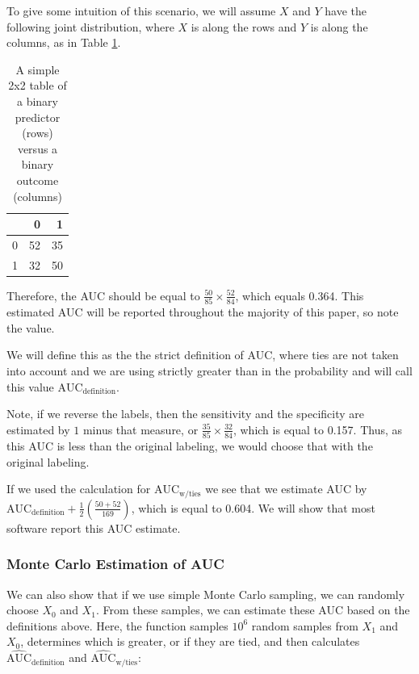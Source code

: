 \documentclass[article]{jss}
\begin{document}
To give some intuition of this scenario, we will assume \(X\) and \(Y\)
have the following joint distribution, where \(X\) is along the rows and
\(Y\) is along the columns, as in Table \ref{tab:create_tab}.

\begin{CodeChunk}
\begin{table}[ht]

\caption{\label{tab:create_tab}A simple 2x2 table of a binary predictor (rows) versus a binary outcome (columns)}
\centering
\begin{tabular}{l|r|r}
\hline
  & 0 & 1\\
\hline
0 & 52 & 35\\
\hline
1 & 32 & 50\\
\hline
\end{tabular}
\end{table}

\end{CodeChunk}

Therefore, the AUC should be equal to
\(\frac{50}{85} \times \frac{52}{84}\), which equals 0.364. This
estimated AUC will be reported throughout the majority of this paper, so
note the value.

We will define this as the the strict definition of AUC, where ties are
not taken into account and we are using strictly greater than in the
probability and will call this value \(\text{AUC}_{\text{definition}}\).

Note, if we reverse the labels, then the sensitivity and the specificity
are estimated by \(1\) minus that measure, or
\(\frac{35}{85} \times \frac{32}{84}\), which is equal to 0.157. Thus,
as this AUC is less than the original labeling, we would choose that
with the original labeling.

If we used the calculation for \(\text{AUC}_{\text{w/ties}}\) we see
that we estimate AUC by
\(\text{AUC}_{\text{definition}} + \frac{1}{2}\left( \frac{50 + 52}{169}\right)\),
which is equal to 0.604. We will show that most software report this AUC
estimate.

\hypertarget{monte-carlo-estimation-of-auc}{%
\subsubsection{Monte Carlo Estimation of
AUC}\label{monte-carlo-estimation-of-auc}}

We can also show that if we use simple Monte Carlo sampling, we can
randomly choose \(X_{0}\) and \(X_{1}\). From these samples, we can
estimate these AUC based on the definitions above. Here, the function
 samples \(\ensuremath{10^{6}}\) random samples from
\(X_{1}\) and \(X_{0}\), determines which is greater, or if they are
tied, and then calculates \(\widehat{\text{AUC}}_{\text{definition}}\)
and \(\widehat{\text{AUC}}_{\text{w/ties}}\):
\end{document}
